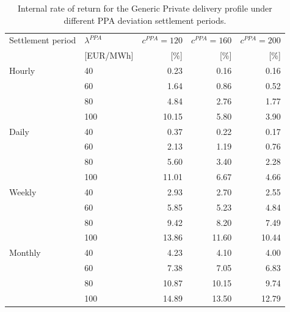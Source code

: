 \begin{table}[H]
\centering
\small
\caption{Internal rate of return for the Generic Private delivery profile under different PPA deviation settlement periods.}
\label{tab:irr_generic_private}
\begin{tabular}{llrrr}
\toprule
Settlement period & $\lambda^{PPA}$ & $c^{PPA}=120$ & $c^{PPA}=160$ & $c^{PPA}=200$ \\
 & [EUR/MWh] & [\%] & [\%] & [\%] \\
\midrule
Hourly & 40 & 0.23 & 0.16 & 0.16 \\
 & 60 & 1.64 & 0.86 & 0.52 \\
 & 80 & 4.84 & 2.76 & 1.77 \\
 & 100 & 10.15 & 5.80 & 3.90 \\
\addlinespace
Daily & 40 & 0.37 & 0.22 & 0.17 \\
 & 60 & 2.13 & 1.19 & 0.76 \\
 & 80 & 5.60 & 3.40 & 2.28 \\
 & 100 & 11.01 & 6.67 & 4.66 \\
\addlinespace
Weekly & 40 & 2.93 & 2.70 & 2.55 \\
 & 60 & 5.85 & 5.23 & 4.84 \\
 & 80 & 9.42 & 8.20 & 7.49 \\
 & 100 & 13.86 & 11.60 & 10.44 \\
\addlinespace
Monthly & 40 & 4.23 & 4.10 & 4.00 \\
 & 60 & 7.38 & 7.05 & 6.83 \\
 & 80 & 10.87 & 10.15 & 9.74 \\
 & 100 & 14.89 & 13.50 & 12.79 \\
\bottomrule
\end{tabular}
\end{table}

